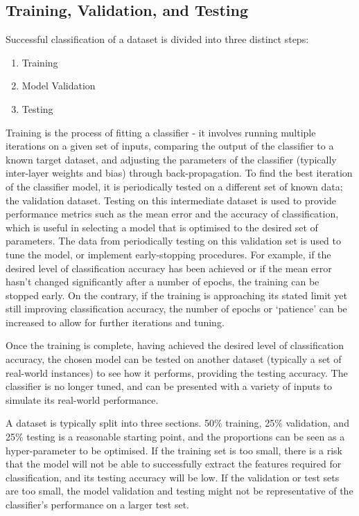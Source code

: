 \subsection{Training, Validation, and Testing}\label{lit:loocv}
Successful classification of a dataset is divided into three distinct steps:
\begin{enumerate}
	\item Training
	\item Model Validation
	\item Testing
\end{enumerate}

Training is the process of fitting a classifier - it involves running multiple iterations on a given set of inputs, comparing the output of the classifier to a known target dataset, and adjusting the parameters of the classifier (typically inter-layer weights and bias) through back-propagation. To find the best iteration of the classifier model, it is periodically tested on a different set of known data; the validation dataset. Testing on this intermediate dataset is used to provide performance metrics such as the mean error and the accuracy of classification, which is useful in selecting a model that is optimised to the desired set of parameters. The data from periodically testing on this validation set is used to tune the model, or implement early-stopping procedures. For example, if the desired level of classification accuracy has been achieved or if the mean error hasn't changed significantly after a number of epochs, the training can be stopped early. On the contrary, if the training is approaching its stated limit yet still improving classification accuracy, the number of epochs or `patience' can be increased to allow for further iterations and tuning.

Once the training is complete, having achieved the desired level of classification accuracy, the chosen model can be tested on another dataset (typically a  set of real-world instances) to see how it performs, providing the testing accuracy. The classifier is no longer tuned, and can be presented with a variety of inputs to simulate its real-world performance.

A dataset is typically split into three sections. 50\% training, 25\% validation, and 25\% testing is a reasonable starting point, and the proportions can be seen as a hyper-parameter to be optimised. If the training set is too small, there is a risk that the model will not be able to successfully extract the features required for classification, and its testing accuracy will be low. If the validation or test sets are too small, the model validation and testing might not be representative of the classifier's performance on a larger test set.

